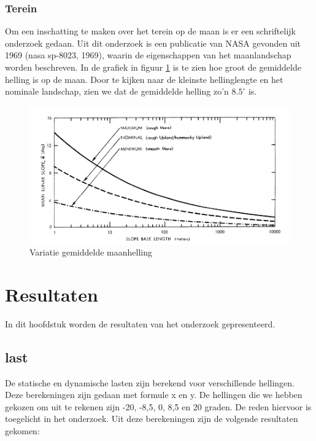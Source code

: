 \documentclass{article}
\begin{document}
            \subsubsection*{Terein}
                Om een inschatting te maken over het terein op de maan is er een schriftelijk onderzoek gedaan.
                Uit dit onderzoek is een publicatie van NASA gevonden uit 1969 (nasa sp-8023, 1969), waarin de eigenschappen van het maanlandschap worden beschreven.
                In de grafiek in figuur \ref{fig:maanhelling} is te zien hoe groot de gemiddelde helling is op de maan.
                Door te kijken naar de kleinste hellinglengte en het nominale landschap, zien we dat de gemiddelde helling zo'n $8.5^\circ$ is.

                \begin{figure}[h]
                    \includegraphics[width=\textwidth]{variation_of_mean_lunar_slope}
                    \caption{Variatie gemiddelde maanhelling}
                    \label{fig:maanhelling}
                    \centering
                \end{figure}
                
    \pagebreak
    \section{Resultaten}
        In dit hoofdstuk worden de resultaten van het onderzoek gepresenteerd.

    \subsection{last}
    De statische en dynamische lasten zijn berekend voor verschillende hellingen. 
    Deze berekeningen zijn gedaan met formule x en y.
    De hellingen die we hebben gekozen om uit te rekenen zijn -20, -8,5, 0, 8,5 en 20 graden.
    De reden hiervoor is toegelicht in het onderzoek.
    Uit deze berekeningen zijn de volgende resultaten gekomen: 
\end{document}
